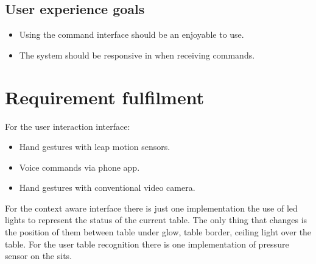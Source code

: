 \documentclass{article}
\begin{document}
\subsection{User experience goals}
\begin{itemize}
    \item Using the command interface should be an enjoyable to use.
    \item The system should be responsive in when receiving commands.
\end{itemize}
\section{Requirement fulfilment}
For the user interaction interface:
\begin{itemize}
    \item Hand gestures with leap motion sensors.
    \item Voice commands via phone app.
    \item Hand gestures with conventional video camera.
\end{itemize}
For the context aware interface there is just one implementation the use of led lights to represent the status of the current table. The only thing that changes is the position of them between table under glow, table border, ceiling light over the table.
For the user table recognition there is one implementation of pressure sensor on the sits.

\end{document}
